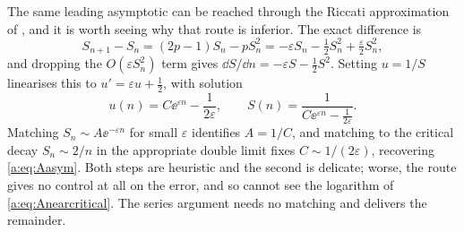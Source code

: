 The same leading asymptotic can be reached through the Riccati approximation of
\ChM, and it is worth seeing why that route is inferior. The exact difference is
\begin{equation*}
S_{n+1}-S_n = (2p-1)S_n - pS_n^2
= -\varepsilon S_n - \tfrac12S_n^2 + \tfrac{\varepsilon}{2}S_n^2 ,
\end{equation*}
and dropping the $O(\varepsilon S_n^2)$ term gives
$\dd S/\dd n = -\varepsilon S-\tfrac12S^2$. Setting $u=1/S$ linearises this to
$u' = \varepsilon u+\tfrac12$, with solution
\begin{equation*}
u(n) = C\ee^{\varepsilon n} - \frac{1}{2\varepsilon},
\qquad
S(n) = \frac{1}{C\ee^{\varepsilon n}-\frac{1}{2\varepsilon}} .
\end{equation*}
Matching $S_n\sim A\ee^{-\varepsilon n}$ for small $\varepsilon$ identifies
$A=1/C$, and matching to the critical decay $S_n\sim2/n$ in the appropriate double
limit fixes $C\sim1/(2\varepsilon)$, recovering \cref{a:eq:Aasym}. Both steps are
heuristic and the second is delicate; worse, the route gives no control at all on
the error, and so cannot see the logarithm of \cref{a:eq:Anearcritical}. The series
argument needs no matching and delivers the remainder.
